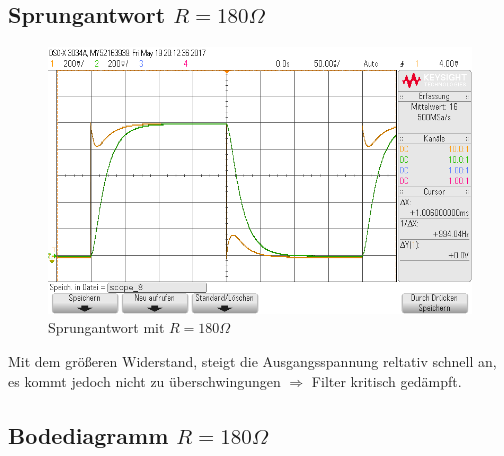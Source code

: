 \subsection{Sprungantwort $R=180\Omega$}

\begin{figure}[H]
  \begin{center}
    \includegraphics[width=1\textwidth]{./Oszi_Bilder/RLC_Sprung_180.png}
    \caption{Sprungantwort mit $R=180\Omega$}
  \end{center}
\end{figure}
\noindent
Mit dem gr\"o\ss{}eren Widerstand, steigt die Ausgangsspannung reltativ schnell an, es kommt jedoch nicht zu \"uberschwingungen $\Rightarrow$ Filter kritisch ged\"ampft. \\

\subsection{Bodediagramm $R=180\Omega$}

